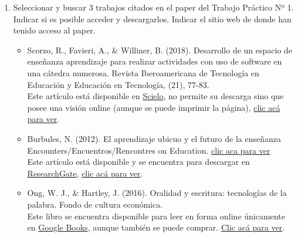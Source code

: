 \documentclass[]{article}
\begin{document}
\begin{enumerate}
	\item Seleccionar y buscar 3 trabajos citados en el paper del Trabajo Práctico Nº 1. Indicar si es posible acceder y descargarlos. Indicar el sitio web de donde han tenido acceso al paper.
	\begin{itemize}
		\item Scorzo, R., Favieri, A., \& Williner, B. (2018). Desarrollo de un espacio de enseñanza aprendizaje para realizar actividades con uso de software en una cátedra numerosa. Revista Iberoamericana de Tecnología en Educación y Educación en Tecnología, (21), 77-83. \\
		Este artículo está disponible en \href{https://www.scielo.org}{Scielo}, no permite su descarga sino que posee una visión online (aunque se puede imprimir la página), \href{http://www.scielo.org.ar/scielo.php?pid=S1850-99592018000100010&script=sci_arttext}{clic acá para ver}.
		\item Burbules, N. (2012). El aprendizaje ubicuo y el futuro de la enseñanza Encounters/Encuentros/Rencontres on Education. \href{https://doi.org/10.15572/ENCO2012.01}{clic aca para ver} \\
		Este artículo está disponible y se encuentra para descargar en \href{https://www.researchgate.net}{ResearchGate}, \href{https://www.researchgate.net/publication/287453889_El_aprendizaje_ubicuo_y_el_futuro_de_la_ensenanza}{clic acá para ver}.
		\item Ong, W. J., \& Hartley, J. (2016). Oralidad y escritura: tecnologías de la palabra. Fondo de cultura económica. \\
		Este libro se encuentra disponible para leer en forma online únicamente en \href{https://books.google.com}{Google Books}, aunque también se puede comprar. \href{https://books.google.com.ar/books?id=E5U-DQAAQBAJ&lpg=PT6&ots=_zVsyyZ7Ni&dq=Oralidad%20y%20Escritura&lr&hl=es&pg=PT6#v=onepage&q=Oralidad%20y%20Escritura&f=false}{Clic acá para ver}.
		
	\end{itemize}


\end{enumerate}
\end{document}
